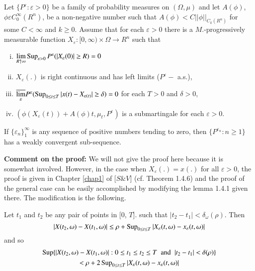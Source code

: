 \setcounter{theorem}{6}
\begin{theorem}\label{chap2:thm2.7}%
Let $\{ P^\varepsilon : \varepsilon > 0 \}$ be a family of probability
measures on $(\Omega, \mu )$ and let $A(\phi)$, $\phi \varepsilon C^\infty_0
(R^n)$, be a non-negative number such that $A(\phi) < C || \phi
||_{C_k(R^n)}$ for some $C < \infty$ and $k \ge 0$. Assume that for
each $\varepsilon > 0$ there is a $M$.-progressively measurable
function $X_\varepsilon : [0, \infty ) \times \Omega \rightarrow R^n$
  such that  
\begin{enumerate}[(i)]
\item $\lim\limits_{R \uparrow \infty} \operatorname{Sup}\limits_{\varepsilon > 0}
  P^\varepsilon(| X_\varepsilon (0)| \ge R) = 0$ 

\item $X_\varepsilon (.)$ is right continuous and has left limits
  ($P^\varepsilon  -$ a.s.),

\item $\overline{\lim\limits_{\varepsilon}} P^{\varepsilon}
  (\operatorname{Sup}\limits_{0\leq t \leq T} |x(t) - X_{\varepsilon (t)}| \geq
  \delta ) =0$ for each $T >0$ and $\delta >0$,

\item $(\phi(X_\varepsilon(t)) + A(\phi)t, \mu_t , P^\varepsilon )$ is a
  submartingale for each $\varepsilon > 0$.
\end{enumerate}

If $\{\varepsilon_n \}^\infty_1$ is any sequence of positive numbers
tending to zero, then $\{P^{\varepsilon_n} : n \ge 1 \}$ has a weakly
convergent sub-sequence. 
\end{theorem}

\medskip
\noindent\textbf{Comment on the proof:}
We will not give the proof here because it is somewhat
involved. However, in the case when $X_\varepsilon(.) = x(.)$ for all
$\varepsilon > 0$, the proof is given in Chapter \ref{chap1} of [$S \& V$]
(cf. Theorem 1.4.6) and the proof of the general case can be easily
accomplished by modifying the lemma 1.4.1 given there. The
modification is the following. 

\begin{lemma*}
Let $t_1$ and $t_2$ be any pair of points in [0, $T$]. such that $|t_2
- t_1| < \delta_\omega(\rho)$. Then 
$$
|X(t_2 , \omega) - X (t_1 ,\omega) | \le \rho + \operatorname{Sup}_{0 \le t \le T} |  
X_\varepsilon (t,\omega) - x_\varepsilon (t, \omega) | 
$$\pageoriginale
and so 
\begin{gather*}
\operatorname{Sup}  \{ |X(t_2, \omega) - X(t_1 ,\omega) | : 0 \le t_1 \le t_2
\le T  \; \text{ and } \; |t_2 - t_1| < \delta (\rho) \} \\
< \rho + 2 \operatorname{Sup}_{0 \le t \le T} |X_\varepsilon (t, \omega) -
x_\varepsilon (t, \omega)| 
\end{gather*}
\end{lemma*}

